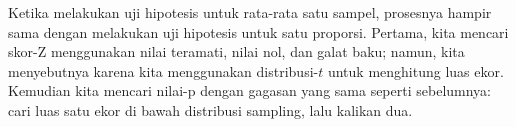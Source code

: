 Ketika melakukan uji hipotesis untuk rata-rata satu sampel,
prosesnya hampir sama dengan melakukan uji hipotesis
untuk satu proporsi.
Pertama, kita mencari skor-Z menggunakan nilai teramati,
nilai nol, dan galat baku;
namun, kita menyebutnya  karena kita menggunakan
distribusi-$t$ untuk menghitung luas ekor.
Kemudian kita mencari nilai-p dengan gagasan yang sama seperti
sebelumnya: cari luas satu ekor di bawah distribusi
sampling, lalu kalikan dua.

\D{\newpage}


